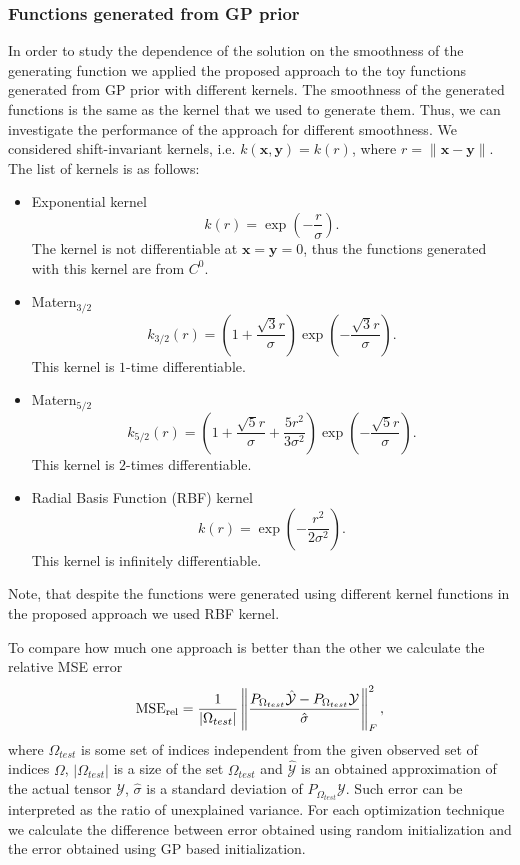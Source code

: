 \subsubsection{Functions generated from GP prior}
In order to study the dependence of the solution on the smoothness of the generating function we applied the proposed approach to the toy functions generated from GP prior with different kernels.
The smoothness of the generated functions is the same as the kernel that we used to generate them.
Thus, we can investigate the performance of the approach for different smoothness.
We considered shift-invariant kernels, i.e. $k(\mathbf{x}, \mathbf{y}) = k(r)$, where $r = \|\mathbf{x} - \mathbf{y}\|$.
The list of kernels is as follows:
\begin{itemize}
    \item Exponential kernel
    \[
        k(r) = \exp \left ( -\frac{r}{\sigma} \right ).
    \]
    The kernel is not differentiable at $\mathbf{x} = \mathbf{y} = 0$, thus
    the functions generated with this kernel are from $C^0$.
    \item Matern$_{3/2}$
    \[
        k_{3/2}(r) = \left (1 + \frac{\sqrt{3}r}{\sigma} \right )
        \exp \left ( -\frac{\sqrt{3}r}{\sigma} \right).
    \]
    This kernel is $1$-time differentiable.
    \item Matern$_{5/2}$
    \[
        k_{5/2}(r) = \left (1 + \frac{\sqrt{5}r}{\sigma} + \frac{5r^2}{3\sigma^2}\right )
        \exp \left ( -\frac{\sqrt{5}r}{\sigma} \right).
    \]
    This kernel is $2$-times differentiable.
    \item Radial Basis Function (RBF) kernel
    \[
        k(r) = \exp \left ( -\frac{r^2}{2\sigma^2} \right ).
    \]
    This kernel is infinitely differentiable.

\end{itemize}
Note, that despite the functions were generated using different kernel functions
in the proposed approach we used RBF kernel.

To compare how much one approach is better than the other we calculate the relative MSE error
\[
    {\rm MSE_{rel}} = \frac{1}{\lvert \Omega_{test}\rvert} \left \|\frac{P_{\Omega_{test}}\hat{\mathcal{Y}} -
      P_{\Omega_{test}}\mathcal{Y}}
      {\hat{\sigma}}\right \|_F^2,
\]
where $\Omega_{test}$ is some set of indices independent from the given observed set of indices $\Omega$, $|\Omega_{test}|$ is a size of the set $\Omega_{test}$ and $\widehat{\mathcal{Y}}$ is an obtained approximation of the actual tensor $\mathcal{Y}$,
$\hat{\sigma}$ is a standard deviation of $P_{\Omega_{test}}\mathcal{Y}$.
Such error can be interpreted as the ratio of unexplained variance.
For each optimization technique we calculate the difference between error obtained using random initialization and the error obtained using GP based initialization.

